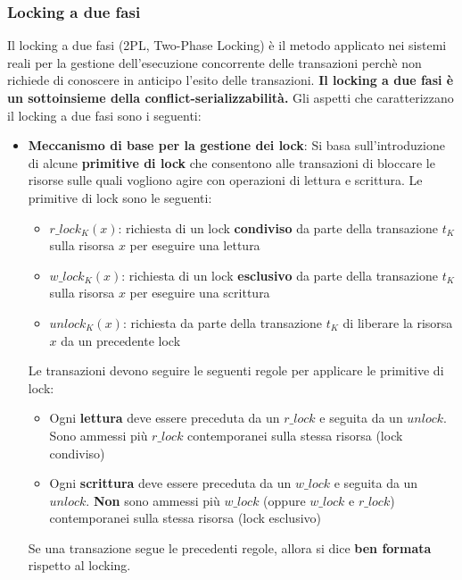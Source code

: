 \documentclass[a4paper,twoside]{article}
\begin{document}
\subsubsection{Locking a due fasi}
Il locking a due fasi (2PL, Two-Phase Locking) è il metodo applicato nei sistemi reali
per la gestione dell'esecuzione concorrente delle transazioni perchè non richiede di
conoscere in anticipo l'esito delle transazioni. \textbf{Il locking a due fasi è un sottoinsieme
della conflict-serializzabilità.}
Gli aspetti che caratterizzano il locking a due fasi sono i seguenti:
\begin{itemize}
  \item \textbf{Meccanismo di base per la gestione dei lock}:
    Si basa sull'introduzione di alcune \textbf{primitive di lock} che consentono
    alle transazioni di bloccare le risorse sulle quali vogliono agire con operazioni
    di lettura e scrittura. Le primitive di lock sono le seguenti:
    \begin{itemize}
      \item \( r\_lock_K(x) \): richiesta di un lock \textbf{condiviso} da parte della
        transazione \( t_K \) sulla risorsa \( x \) per eseguire una lettura

      \item \( w\_lock_K(x) \): richiesta di un lock \textbf{esclusivo} da parte della
        transazione \( t_K \) sulla risorsa \( x \) per eseguire una scrittura

      \item \( unlock_K(x) \): richiesta da parte della transazione \( t_K \) di
        liberare la risorsa \( x \) da un precedente lock
    \end{itemize}
    Le transazioni devono seguire le seguenti regole per applicare le primitive di
    lock:
    \begin{itemize}
      \item Ogni \textbf{lettura} deve essere preceduta da un \( r\_lock \) e seguita
        da un \( unlock \). Sono ammessi più \( r\_lock \) contemporanei sulla stessa
        risorsa (lock condiviso)

      \item Ogni \textbf{scrittura} deve essere preceduta da un \( w\_lock \) e seguita
        da un \( unlock \). \textbf{Non} sono ammessi più \( w\_lock \) (oppure
        \( w\_lock \) e \( r\_lock \)) contemporanei sulla stessa risorsa (lock
        esclusivo)
    \end{itemize}
    Se una transazione segue le precedenti regole, allora si dice \textbf{ben formata}
    rispetto al locking.


\end{itemize}
\end{document}
